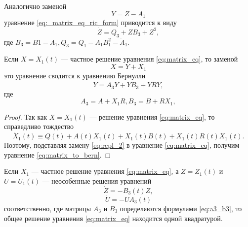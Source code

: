 Аналогично заменой
\begin{equation}
    Y = Z - A_1
\end{equation}
уравнение \eqref{eq:_matrix_eq_ric_form} приводится к виду
\begin{equation}
    \dot Z = Q_3 + Z B_3 + Z^2,
\end{equation}
где $B_3 = B1 - A_1, Q_3 = Q_1 - A_1 B_{1}^{2} - \dot A_1.$
\begin{theorem} \label{matrix_theorem_1}
    Если $X = X_1(t)$ --- частное решение уравнения \eqref{eq:matrix_eq}, то заменой
    \begin{equation} \label{eq:repl_2}
        X = Y + X_1
    \end{equation} 
    это уравнение сводится к уравнению Бернулли
    \begin{equation} \label{eq:matrix_to_bern}
        \dot Y = A_3 Y + Y B_3 + Y R Y,
    \end{equation}
    где
    \begin{equation} \label{eq:a3_b3}
        A_3 = A + X_1 R, B_3 = B + R X_1, 
    \end{equation}
\end{theorem}
\begin{proof}
    Так как $X = X_1(t)$ --- решение уравнения \eqref{eq:matrix_eq}, то справедливо тождество
    \begin{equation}
    \dot X_1(t) \equiv Q(t) + A(t) X_1(t) + X_1(t) B(t) + X_1(t) R(t) X_1(t).
    \end{equation}
    Поэтому, подставляя замену \eqref{eq:repl_2} в уравнение \eqref{eq:matrix_eq}, получим уравнение \eqref{eq:matrix_to_bern}.
\end{proof}
\begin{theorem} \label{matrix_theorem_2}
    Если $X_1$ --- частное решение уравнения \eqref{eq:matrix_eq}, а $Z = Z_1(t)$ и $U = U_1(t)$ --- неособенные решения уравнений
    \begin{equation} \label{eq:z_point}
        \dot Z = - B_3(t) Z,
    \end{equation}
    \begin{equation} \label{eq:u_point}
        \dot U = -U A_3 (t)
    \end{equation}
    соответственно, где матрицы $A_3$ и $B_3$ определяются формулами \eqref{eq:a3_b3}, то общее решение уравнения \eqref{eq:matrix_eq} находится одной квадратурой.
\end{theorem}
